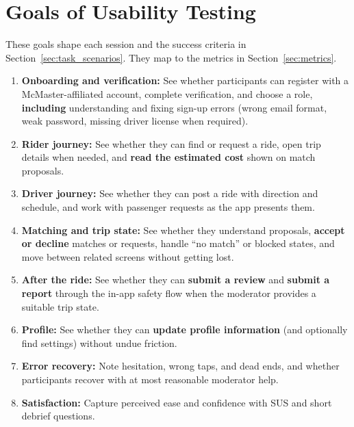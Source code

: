 \section{Goals of Usability Testing}
\label{sec:goals}

These goals shape each session and the success criteria in Section~\ref{sec:task_scenarios}. They map to the metrics in Section~\ref{sec:metrics}.

\begin{enumerate}
  \item \textbf{Onboarding and verification:} See whether participants can register with a McMaster-affiliated account, complete verification, and choose a role, \textbf{including} understanding and fixing sign-up errors (wrong email format, weak password, missing driver license when required).
  \item \textbf{Rider journey:} See whether they can find or request a ride, open trip details when needed, and \textbf{read the estimated cost} shown on match proposals.
  \item \textbf{Driver journey:} See whether they can post a ride with direction and schedule, and work with passenger requests as the app presents them.
  \item \textbf{Matching and trip state:} See whether they understand proposals, \textbf{accept or decline} matches or requests, handle ``no match'' or blocked states, and move between related screens without getting lost.
  \item \textbf{After the ride:} See whether they can \textbf{submit a review} and \textbf{submit a report} through the in-app safety flow when the moderator provides a suitable trip state.
  \item \textbf{Profile:} See whether they can \textbf{update profile information} (and optionally find settings) without undue friction.
  \item \textbf{Error recovery:} Note hesitation, wrong taps, and dead ends, and whether participants recover with at most reasonable moderator help.
  \item \textbf{Satisfaction:} Capture perceived ease and confidence with SUS and short debrief questions.
\end{enumerate}
